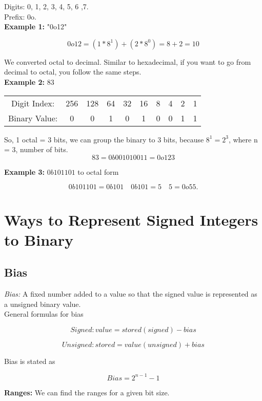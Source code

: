 \documentclass{article}
\begin{document}
\noindent Digits: 0, 1, 2, 3, 4, 5, 6 ,7. \\

\noindent Prefix: 0o. \\

\noindent \textbf{Example 1:} "0o12"

\[
0o12 = (1 * 8^1) + (2 * 8^0) = 8 + 2 = 10
\]

We converted octal to decimal. Similar to hexadecimal, if you want to go from decimal to octal, you follow
the same steps. \\

\noindent \textbf{Example 2:} $83$

\begin{center}
\begin{tabular}{c c c c c c c c c c}
Digit Index: & 256 & 128 & 64 & 32 & 16 & 8 & 4 & 2 & 1 \\ 
Binary Value: & 0 & 0 & 1 & 0 & 1 & 0 & 0 & 1 & 1 \\
\end{tabular}
\end{center}

So, 1 octal = 3 bits, we can group the binary to 3 bits, because $8^1 = 2^3$, where n = 3, number 
of bits.
\[
83 = 0b001 010 011 = 0o123
\]

\noindent \textbf{Example 3:} $0b101101$ to octal form

\[
0b101101 = 0b101\quad 0b101 = 5\quad 5 = 0o55.
\]

\section{Ways to Represent Signed Integers to Binary}
\subsection*{Bias}
\textit{Bias:} A fixed number added to a value so that the signed value is represented as a unsigned binary value. \\

\noindent General formulas for bias

\[
Signed: value = stored(signed) - bias
\]

\[
Unsigned: stored = value(unsigned)  + bias
\]

\noindent Bias is stated as 

\[
Bias = 2^{n-1} - 1
\]

\noindent \textbf{Ranges:} We can find the ranges for a given bit size. \\
\end{document}
